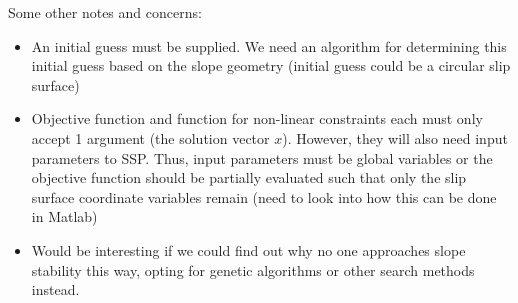 \documentclass[12pt]{article}
\begin{document}
Some other notes and concerns:

\begin{itemize}
	\item An initial guess must be supplied. We need an algorithm for 
	determining this initial guess based on the slope geometry (initial guess 
	could be a circular slip surface)
	\item Objective function and function for non-linear constraints each must 
	only accept 1 argument (the solution vector $x$). However, they will also 
	need input parameters to SSP. Thus, input parameters must be global 
	variables or the objective function should be partially evaluated such that 
	only the slip surface coordinate variables remain (need to look into how 
	this can be done in Matlab)
	\item Would be interesting if we could find out why no one approaches slope 
	stability this way, opting for genetic algorithms or other search methods 
	instead.
\end{itemize}
\end{document}
